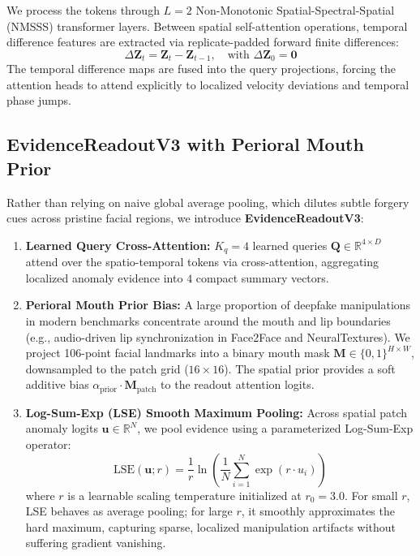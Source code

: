 We process the tokens through $L=2$ Non-Monotonic Spatial-Spectral-Spatial (NMSSS) transformer layers. Between spatial self-attention operations, temporal difference features are extracted via replicate-padded forward finite differences:
\begin{equation}
\Delta \mathbf{Z}_t = \mathbf{Z}_t - \mathbf{Z}_{t-1}, \quad \text{with } \Delta \mathbf{Z}_0 = \mathbf{0}
\end{equation}
The temporal difference maps are fused into the query projections, forcing the attention heads to attend explicitly to localized velocity deviations and temporal phase jumps.

\subsection{EvidenceReadoutV3 with Perioral Mouth Prior}
Rather than relying on naive global average pooling, which dilutes subtle forgery cues across pristine facial regions, we introduce \textbf{EvidenceReadoutV3}:
\begin{enumerate}[leftmargin=*]
    \item \textbf{Learned Query Cross-Attention:} $K_q=4$ learned queries $\mathbf{Q} \in \mathbb{R}^{4 \times D}$ attend over the spatio-temporal tokens via cross-attention, aggregating localized anomaly evidence into $4$ compact summary vectors.
    \item \textbf{Perioral Mouth Prior Bias:} A large proportion of deepfake manipulations in modern benchmarks concentrate around the mouth and lip boundaries (e.g., audio-driven lip synchronization in Face2Face and NeuralTextures). We project 106-point facial landmarks into a binary mouth mask $\mathbf{M} \in \{0, 1\}^{H \times W}$, downsampled to the patch grid ($16 \times 16$). The spatial prior provides a soft additive bias $\alpha_{\text{prior}} \cdot \mathbf{M}_{\text{patch}}$ to the readout attention logits.
    \item \textbf{Log-Sum-Exp (LSE) Smooth Maximum Pooling:} Across spatial patch anomaly logits $\mathbf{u} \in \mathbb{R}^{N}$, we pool evidence using a parameterized Log-Sum-Exp operator:
    \begin{equation}
    \text{LSE}(\mathbf{u}; r) = \frac{1}{r} \ln \left( \frac{1}{N} \sum_{i=1}^N \exp(r \cdot u_i) \right)
    \end{equation}
    where $r$ is a learnable scaling temperature initialized at $r_0 = 3.0$. For small $r$, LSE behaves as average pooling; for large $r$, it smoothly approximates the hard maximum, capturing sparse, localized manipulation artifacts without suffering gradient vanishing.
\end{enumerate}

